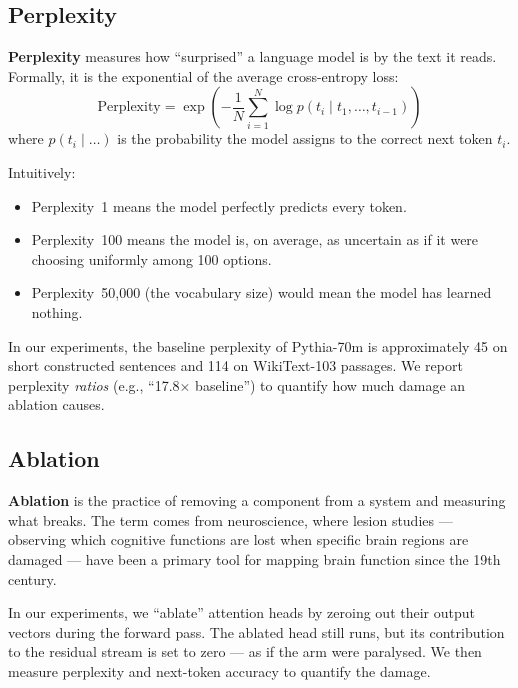 \documentclass[11pt,a4paper]{article}
\begin{document}
\subsection{Perplexity}
\label{sec:perplexity}

\textbf{Perplexity} measures how ``surprised'' a language model is by the text it reads.
Formally, it is the exponential of the average cross-entropy loss:
\[
    \text{Perplexity} = \exp\!\left(-\frac{1}{N}\sum_{i=1}^{N} \log p(t_i \mid t_1, \ldots, t_{i-1})\right)
\]
where $p(t_i \mid \ldots)$ is the probability the model assigns to the correct next token $t_i$.

Intuitively:
\begin{itemize}[itemsep=2pt]
    \item Perplexity~1 means the model perfectly predicts every token.
    \item Perplexity~100 means the model is, on average, as uncertain as if it were choosing uniformly among 100 options.
    \item Perplexity~50{,}000 (the vocabulary size) would mean the model has learned nothing.
\end{itemize}

In our experiments, the baseline perplexity of Pythia-70m is approximately 45 on short constructed sentences and 114 on WikiText-103 passages.
We report perplexity \emph{ratios} (e.g., ``17.8$\times$ baseline'') to quantify how much damage an ablation causes.

\subsection{Ablation}
\label{sec:ablation}

\textbf{Ablation} is the practice of removing a component from a system and measuring what breaks.
The term comes from neuroscience, where lesion studies --- observing which cognitive functions are lost when specific brain regions are damaged --- have been a primary tool for mapping brain function since the 19th century.

In our experiments, we ``ablate'' attention heads by zeroing out their output vectors during the forward pass.
The ablated head still runs, but its contribution to the residual stream is set to zero --- as if the arm were paralysed.
We then measure perplexity and next-token accuracy to quantify the damage.
\end{document}
